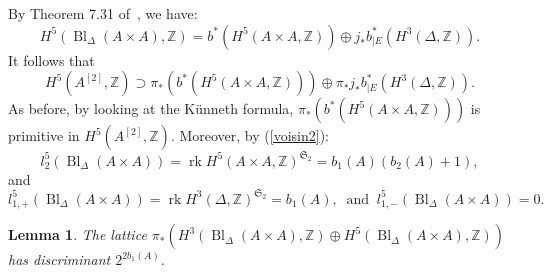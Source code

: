 \documentclass{alggeom}
\DeclareMathOperator{\rk}{rk}
\DeclareMathOperator{\Bl}{Bl}
\newcommand{\Z}{\mathbb{Z}}
\theoremstyle{plain}
\newtheorem{lemma}[theorem]{Lemma}
\theoremstyle{definition}
\theoremstyle{remark}
\begin{document}
By Theorem 7.31 of~\cite{Voisin}, we have:
\begin{equation}
H^{5}(\Bl_\Delta(A\! \times\! A),\Z)=b^*(H^{5}(A\times A,\Z))\oplus j_*b_{|E}^{*}(H^{3}(\Delta,\Z)).
\label{voisin2}
\end{equation}
It follows that $$H^{5}(A^{[2]},\Z)\supset \pi_{*}(b^*(H^{5}(A\times A,\Z)))\oplus \pi_{*}j_*b_{|E}^{*}(H^{3}(\Delta,\Z)).$$
As before, by looking at the K\"unneth formula, $\pi_{*}(b^*(H^{5}(A\times A,\Z)))$ is primitive in $H^{5}(A^{[2]},\Z)$.
Moreover, by (\ref{voisin2}):
$$
l_2^5(\Bl_\Delta(A\! \times\! A))=\rk H^{5}(A\times A,\Z)^{\mathfrak{S}_2}=b_1(A)(b_2(A)+1),
$$
and 
\begin{equation}
l_{1,+}^5(\Bl_\Delta(A\! \times\! A))=\rk H^{3}(\Delta,\Z)^{\mathfrak{S}_2}=b_1(A),\ \text{ and }\ l_{1,-}^5(\Bl_\Delta(A\! \times\! A))=0.
\label{l2}
\end{equation}
\begin{lemma}
The lattice $\pi_{*}(H^{3}(\Bl_\Delta(A\! \times\! A),\Z)\oplus H^{5}(\Bl_\Delta(A\! \times\! A),\Z))$ has discriminant $2^{2b_1(A)}$.
\end{lemma}
\end{document}
